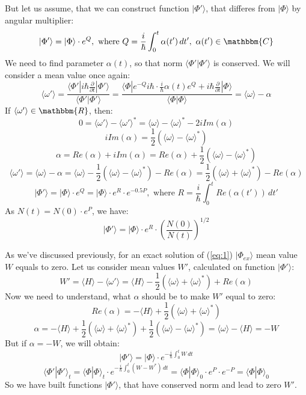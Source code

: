 But let us assume, that we can construct function $|\Phi'\rangle$, that differes from $|\Phi\rangle$ by angular multiplier:
$$|\Phi'\rangle = |\Phi\rangle\cdot e^Q,\text{ where } Q = \frac{i}{\hbar}\int_0^t\alpha(t')\,dt',\ \alpha(t')\in\mathbbm{C}$$
We need to find parameter $\alpha(t)$, so that norm $\langle\Phi'|\Phi'\rangle$ is conserved. 
We will consider a mean value once again:
$$\langle\omega'\rangle = \frac{\langle\Phi'|i\hbar\frac{\partial}{\partial t}|\Phi'\rangle}{\langle\Phi'|\Phi'\rangle} = %
			  \frac{\langle\Phi|e^{-Q} i\hbar \cdot \frac{i}{\hbar} \alpha(t) e^Q + %
			   i\hbar\frac{\partial}{\partial t}|\Phi\rangle}{\langle\Phi|\Phi\rangle}=\langle\omega\rangle - \alpha$$
If $\langle\omega'\rangle\in\mathbbm{R}$, then:
$$0 = \langle\omega'\rangle-\langle\omega'\rangle^* = \langle\omega\rangle - \langle\omega\rangle^* - 2i\mathit{Im}( \alpha )$$
$$i\mathit{Im}( \alpha ) = \frac{1}{2}\left( \langle\omega\rangle - \langle\omega\rangle^*\right)$$
$$\alpha = \mathit{Re}( \alpha ) + i\mathit{Im}( \alpha ) = %
	   \mathit{Re}( \alpha ) + \frac{1}{2}\left( \langle\omega\rangle - \langle\omega\rangle^*\right)$$
$$\langle\omega'\rangle = \langle\omega\rangle - \alpha = %
			  \langle\omega\rangle - \frac{1}{2}\left(\langle\omega\rangle - %
								  \langle\omega\rangle^*\right) - \mathit{Re}( \alpha ) = %
			  \frac{1}{2}\left(\langle\omega\rangle + \langle\omega\rangle^*\right) - \mathit{Re}( \alpha )$$
$$|\Phi'\rangle = |\Phi\rangle\cdot e^Q = |\Phi\rangle\cdot e^R\cdot e^{-0.5P},%
					      \text{ where } R = \frac{i}{\hbar}\int_0^t\mathit{Re}(\alpha(t'))\,dt'$$
As $N(t) = N(0)\cdot e^P $, we have:
$$|\Phi'\rangle = |\Phi\rangle\cdot e^R\cdot\left(\frac{N(0)}{N(t)}\right)^{1/2}$$

As we've discussed previously, for an exact solution of (\ref{eq:1}) $|\Phi_{ex}\rangle$ mean value $W$ equals to zero.
 Let us consider mean values $W'$, calculated on function $|\Phi'\rangle$:
$$W' = \langle H\rangle - \langle\omega'\rangle = %
		      \langle H\rangle - \frac{1}{2}\left(\langle\omega\rangle+\langle\omega\rangle^*\right)+\mathit{Re}(\alpha)$$
Now we need to understand, what $\alpha$ should be to make $W'$ equal to zero:
$$\mathit{Re}(\alpha) = -\langle H\rangle + \frac{1}{2}\left(\langle\omega\rangle+\langle\omega\rangle^*\right)$$
$$\alpha = -\langle H\rangle + \frac{1}{2}\left(\langle\omega\rangle+\langle\omega\rangle^*\right) +%
			      \frac{1}{2}\left(\langle\omega\rangle-\langle\omega\rangle^*\right)=%
	    \langle\omega\rangle - \langle H\rangle = -W$$
But if $\alpha = -W$, we will obtain:
$$|\Phi'\rangle = |\Phi\rangle\cdot e^{ -\frac{i}{\hbar}\int_0^t W\,dt}$$
$$\langle\Phi'|\Phi'\rangle_t = \langle\Phi|\Phi\rangle_t\cdot e^{ -\frac{i}{\hbar}\int_0^t(W-W^*)\,dt} = %
				\langle\Phi|\Phi\rangle_0\cdot e^P\cdot e^{-P} = \langle\Phi|\Phi\rangle_0$$
So we have built functions $|\Phi'\rangle$, that have conserved norm and lead to zero $W'$. 

